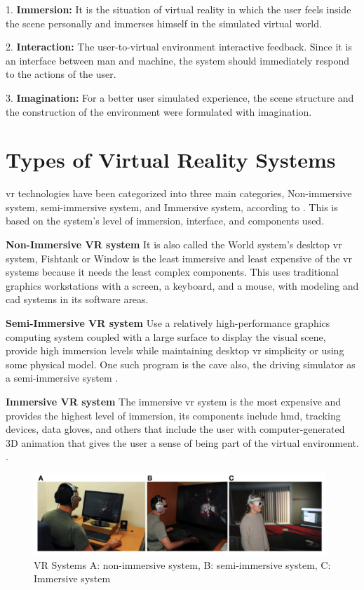 1. \textbf{Immersion:} It is the situation of virtual reality in which the user feels inside the scene personally and immerses himself in the simulated virtual world.



2. \textbf{Interaction:} The user-to-virtual environment interactive feedback. Since it is an interface between man and machine, the system should immediately respond to the actions of the user.




3. \textbf{Imagination:} For a better user simulated experience, the scene structure and the construction of the environment were formulated with imagination.

\section{Types of Virtual Reality Systems} \acrshort{vr} technologies have been categorized into three main categories, Non-immersive system, semi-immersive system, and Immersive system, according to \cite{Bamodu2013VirtualComponents}. This is based on the system's level of immersion, interface, and components used.  

\textbf{Non-Immersive VR system}
It is also called the World system's desktop \acrshort{vr} system, Fishtank or Window is the least immersive and least expensive of the \acrshort{vr} systems because it needs the least complex components. This uses traditional graphics workstations with a screen, a keyboard, and a mouse, with modeling and \acrfull{cad} systems in its software areas.  

\textbf{Semi-Immersive VR system}
Use a relatively high-performance graphics computing system coupled with a large surface to display the visual scene, provide high immersion levels while maintaining desktop \acrshort{vr} simplicity or using some physical model. One such program is the \acrfull{cave} also, the driving simulator as a semi-immersive system \citep{Bamodu2013VirtualComponents}. 

\textbf{Immersive VR system}
 The immersive \acrshort{vr} system is the most expensive and provides the highest level of immersion, its components include \acrfull{hmd}, tracking devices, data gloves, and others that include the user with computer-generated 3D animation that gives the user a sense of being part of the virtual environment. \citep{Bamodu2013VirtualComponents, Baus2014MovingReview}.

\begin{figure}[ht]
    \centering
    \includegraphics[width=0.98\textwidth]{images/vrsystem.png}
    \caption{VR Systems A: non-immersive system, B: semi-immersive system, C: Immersive system \citep{Baus2014MovingReview}}
    \label{fig:vrsys}
\end{figure}


